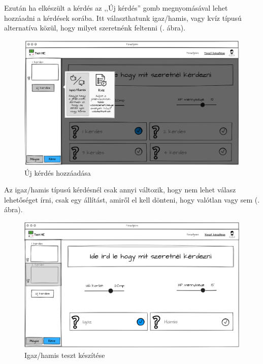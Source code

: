 Ezután ha elkészült a kérdés az ,,Új kérdés'' gomb megnyomásával lehet hozzáadni a kérdések sorába. Itt választhatunk igaz/hamis, vagy kvíz típusú alternatíva közül, hogy milyet szeretnénk feltenni (. ábra).

\begin{figure}[H]
    \centering
    \includegraphics[width=\linewidth]{images/make_test2_wireframe.png}
    \caption{Új kérdés hozzáadása}
    \label{fig:new_question}
\end{figure}

Az igaz/hamis típusú kérdésnél csak annyi változik, hogy nem lehet válasz lehetőséget írni, csak egy állítást, amiről el kell dönteni, hogy valótlan vagy sem (. ábra).

\begin{figure}[h!]
    \centering
    \includegraphics[width=\linewidth]{images/make_test3_wireframe.png}
    \caption{Igaz/hamis teszt készítése}
    \label{fig:test_true_false}
\end{figure}

